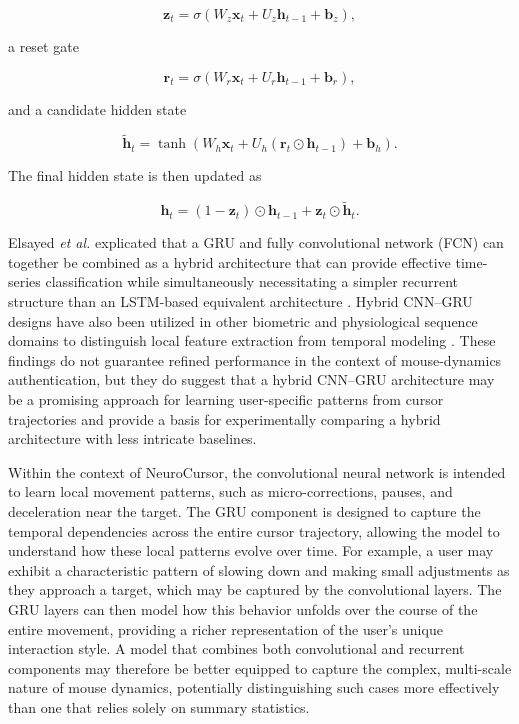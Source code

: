 \documentclass[conference]{IEEEtran}
\begin{document}
\begin{equation}
\mathbf{z}_t
=
\sigma
\left(
W_z\mathbf{x}_t
+
U_z\mathbf{h}_{t-1}
+
\mathbf{b}_z
\right),
\end{equation}

a reset gate 

\begin{equation}
\mathbf{r}_t
=
\sigma
\left(
W_r\mathbf{x}_t
+
U_r\mathbf{h}_{t-1}
+
\mathbf{b}_r
\right),
\end{equation}

and a candidate hidden state

\begin{equation}
\widetilde{\mathbf{h}}_t
=
\tanh
\left(
W_h\mathbf{x}_t
+
U_h
\left(
\mathbf{r}_t \odot \mathbf{h}_{t-1}
\right)
+
\mathbf{b}_h
\right).
\end{equation}

The final hidden state is then updated as

\begin{equation}
\mathbf{h}_t
=
(1-\mathbf{z}_t) \odot \mathbf{h}_{t-1}
+
\mathbf{z}_t\odot\widetilde{\mathbf{h}}_t.
\label{eq:gru_hidden_state}
\end{equation}

Elsayed \textit{et al.} explicated that a GRU and fully convolutional network (FCN) can together be combined as a hybrid architecture that can provide effective time-series classification while simultaneously necessitating a simpler recurrent structure than an LSTM-based equivalent architecture \cite{elsayedGRUFCN}. Hybrid CNN--GRU designs have also been utilized in other biometric and physiological sequence domains to distinguish local feature extraction from temporal modeling \cite{bangCNNGRU}. These findings do not guarantee refined performance in the context of mouse-dynamics authentication, but they do suggest that a hybrid CNN--GRU architecture may be a promising approach for learning user-specific patterns from cursor trajectories and provide a basis for experimentally comparing a hybrid architecture with less intricate baselines.

Within the context of NeuroCursor, the convolutional neural network is intended to learn local movement patterns, such as micro-corrections, pauses, and deceleration near the target. The GRU component is designed to capture the temporal dependencies across the entire cursor trajectory, allowing the model to understand how these local patterns evolve over time. For example, a user may exhibit a characteristic pattern of slowing down and making small adjustments as they approach a target, which may be captured by the convolutional layers. The GRU layers can then model how this behavior unfolds over the course of the entire movement, providing a richer representation of the user's unique interaction style. A model that combines both convolutional and recurrent components may therefore be better equipped to capture the complex, multi-scale nature of mouse dynamics, potentially distinguishing such cases more effectively than one that relies solely on summary statistics. 
\end{document}
